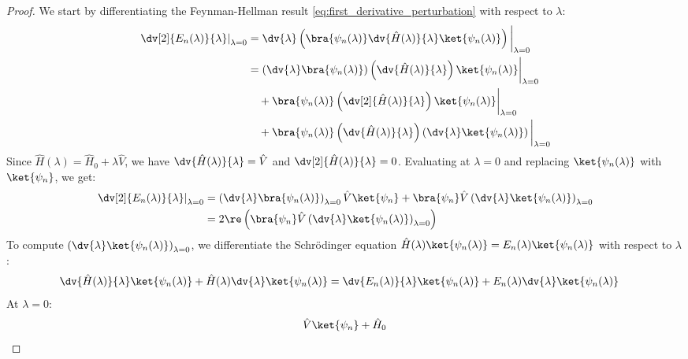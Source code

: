 \begin{proof}
  We start by differentiating the Feynman-Hellman result
  \eqref{eq:first_derivative_perturbation} with respect to $\lambda$:
  \begin{align} \label{eq:second_deriv_start}
    \left.\dv[2]{E_n(\lambda)}{\lambda}\right|_{\lambda=0} &=
    \dv{\lambda}\left(\bra{\psi_n(\lambda)} \dv{\hat
    H(\lambda)}{\lambda} \ket{\psi_n(\lambda)}\right)\bigg|_{\lambda=0} \\
    &= \left(\dv{\lambda}\bra{\psi_n(\lambda)}\right)
    \left(\dv{\hat H(\lambda)}{\lambda}\right)
    \ket{\psi_n(\lambda)} \bigg|_{\lambda=0} \notag \\
    &\quad + \bra{\psi_n(\lambda)} \left(\dv[2]{\hat
    H(\lambda)}{\lambda}\right) \ket{\psi_n(\lambda)}
    \bigg|_{\lambda=0} \notag \\
    &\quad + \bra{\psi_n(\lambda)} \left(\dv{\hat
    H(\lambda)}{\lambda}\right)
    \left(\dv{\lambda}\ket{\psi_n(\lambda)}\right) \bigg|_{\lambda=0} \notag
  \end{align}
  Since $\hat H(\lambda) = \hat H_0 + \lambda \hat V$, we have
  $\dv{\hat H(\lambda)}{\lambda} = \hat V$ and $\dv[2]{\hat
  H(\lambda)}{\lambda} = 0$. Evaluating at $\lambda=0$ and
  replacing $\ket{\psi_n(\lambda)}$ with $\ket{\psi_n}$, we get:
  \begin{align} \label{eq:second_deriv_intermediate}
    \left.\dv[2]{E_n(\lambda)}{\lambda}\right|_{\lambda=0} &=
    \left(\dv{\lambda}\bra{\psi_n(\lambda)}\right)_{\lambda=0}
    \hat V \ket{\psi_n} + \bra{\psi_n} \hat V
    \left(\dv{\lambda}\ket{\psi_n(\lambda)}\right)_{\lambda=0} \\
    &= 2 \re \left( \bra{\psi_n} \hat V
      \left(\dv{\lambda}\ket{\psi_n(\lambda)}\right)_{\lambda=0}
    \right) \notag
  \end{align}
  To compute
  $\left(\dv{\lambda}\ket{\psi_n(\lambda)}\right)_{\lambda=0}$, we
  differentiate the Schrödinger equation $\hat
  H(\lambda)\ket{\psi_n(\lambda)} =
  E_n(\lambda)\ket{\psi_n(\lambda)}$ with respect to $\lambda$:
  \begin{align} \label{eq:schrodinger_deriv}
    \dv{\hat H(\lambda)}{\lambda} \ket{\psi_n(\lambda)} + \hat
    H(\lambda) \dv{\lambda}\ket{\psi_n(\lambda)} &=
    \dv{E_n(\lambda)}{\lambda} \ket{\psi_n(\lambda)} +
    E_n(\lambda) \dv{\lambda}\ket{\psi_n(\lambda)}
  \end{align}
  At $\lambda=0$:
  \begin{align} \label{eq:schrodinger_deriv_at_zero}
    \hat V \ket{\psi_n} + \hat H_0

\end{align}
\end{proof}
